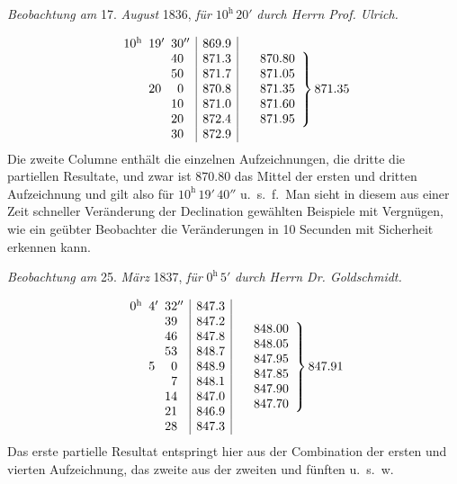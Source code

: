 \begin{center}\textit{Beobachtung am} 17. \textit{August} 1836, \textit{für} $10^{\mathrm h}\,20'$ \textit{durch Herrn Prof. Ulrich.}\end{center}
\[
\begin{array}{r@{}l@{\enspace}r@{}l@{\enspace}r@{}l|r|}
10&{}^{\mathrm h}&19&{}'&30&{}''&869.9\\
&&&&40&&871.3\\
&&&&50&&871.7\\
&&20&&0&&870.8\\
&&&&10&&871.0\\
&&&&20&&872.4\\
&&&&30&&872.9
\end{array}\quad
\left.\begin{array}{r}870.80\\871.05\\871.35\\871.60\\871.95\end{array}\right\}871.35
\]
Die zweite Columne enthält die einzelnen Aufzeichnungen, die dritte die partiellen Resultate, und zwar ist $870.80$ das Mittel der ersten und dritten Aufzeichnung und gilt also für $10^{\mathrm h}\,19'\,40''$ u.\ s.\ f.\ Man sieht in diesem aus einer Zeit schneller Veränderung der Declination gewählten Beispiele mit Vergnügen, wie ein geübter Beobachter die Veränderungen in 10 Secunden mit Sicherheit erkennen kann.

\par\clearpage
{}

\begin{center}\textit{Beobachtung am} 25. \textit{März} 1837, \textit{für} $0^{\mathrm h}\,5'$ \textit{durch Herrn Dr. Goldschmidt.}\end{center}
\[
\begin{array}{r@{}l@{\enspace}r@{}l@{\enspace}r@{}l|r|}
0&{}^{\mathrm h}&4&{}'&32&{}''&847.3\\
&&&&39&&847.2\\
&&&&46&&847.8\\
&&&&53&&848.7\\
&&5&&0&&848.9\\
&&&&7&&848.1\\
&&&&14&&847.0\\
&&&&21&&846.9\\
&&&&28&&847.3
\end{array}\quad
\left.\begin{array}{r}848.00\\848.05\\847.95\\847.85\\847.90\\847.70\end{array}\right\}847.91
\]
Das erste partielle Resultat entspringt hier aus der Combination der ersten und vierten Aufzeichnung, das zweite aus der zweiten und fünften u.\ s.\ w.

